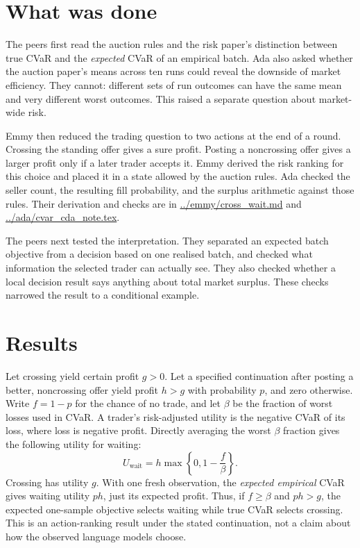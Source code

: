 \documentclass{article}
\begin{document}
\section{What was done}

The peers first read the auction rules and the risk paper's distinction between true CVaR and the
\emph{expected} CVaR of an empirical batch. Ada also asked whether the auction paper's means across
ten runs could reveal the downside of market efficiency. They cannot: different sets of run outcomes
can have the same mean and very different worst outcomes. This raised a separate question about
market-wide risk.

Emmy then reduced the trading question to two actions at the end of a round. Crossing the standing
offer gives a sure profit. Posting a noncrossing offer gives a larger profit only if a later trader
accepts it. Emmy derived the risk ranking for this choice and placed it in a state allowed by the
auction rules. Ada checked the seller count, the resulting fill probability, and the surplus
arithmetic against those rules. Their derivation and checks are in \url{../emmy/cross_wait.md} and
\url{../ada/cvar_cda_note.tex}.

The peers next tested the interpretation. They separated an expected batch objective from a decision
based on one realised batch, and checked what information the selected trader can actually see. They
also checked whether a local decision result says anything about total market surplus. These checks
narrowed the result to a conditional example.

\section{Results}

Let crossing yield certain profit \(g>0\). Let a specified continuation after posting a better,
noncrossing offer yield profit \(h>g\) with probability \(p\), and zero otherwise. Write \(f=1-p\)
for the chance of no trade, and let \(\beta\) be the fraction of worst losses used in CVaR. A
trader's risk-adjusted utility is the negative CVaR of its loss, where loss is negative profit.
Directly averaging the worst \(\beta\) fraction gives the following utility for waiting:
\[
U_{\mathrm{wait}}=h\max\left\{0,1-\frac{f}{\beta}\right\}.
\]
Crossing has utility \(g\). With one fresh observation, the \emph{expected empirical} CVaR gives
waiting utility \(ph\), just its expected profit. Thus, if \(f\geq\beta\) and \(ph>g\), the expected
one-sample objective selects waiting while true CVaR selects crossing. This is an action-ranking
result under the stated continuation, not a claim about how the observed language models choose.
\end{document}
